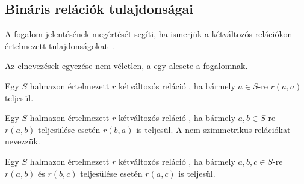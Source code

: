 \subsection{Bináris relációk tulajdonságai}

A  fogalom jelentésének megértését segíti, ha ismerjük a kétváltozós relációkon értelmezett tulajdonságokat~\cite{wiki:relacio}.

\begin{tipp}
	Az elnevezések egyezése nem véletlen, a  egy alesete a  fogalomnak.
\end{tipp}


\begin{definicio}
	Egy $S$ halmazon értelmezett $r$ kétváltozós reláció , ha bármely $a \in S$-re $r(a, a)$ teljesül.
\end{definicio}

\begin{definicio}
	Egy $S$ halmazon értelmezett $r$ kétváltozós reláció , ha bármely $a,b \in S$-re $r(a, b)$ teljesülése esetén $r(b, a)$ is teljesül. A nem szimmetrikus relációkat  nevezzük.
\end{definicio}

\begin{definicio}
	Egy $S$ halmazon értelmezett $r$ kétváltozós reláció , ha bármely $a,b,c \in S$-re $r(a, b)$ és $r(b, c)$ teljesülése esetén $r(a, c)$ is teljesül.
\end{definicio}

